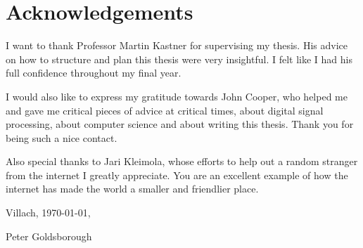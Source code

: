 \chapter*{Acknowledgements}

I want to thank Professor Martin Kastner for supervising my thesis. His advice on how to structure and plan this thesis were very insightful. I felt like I had his full confidence throughout my final year.

\noindent I would also like to express my gratitude towards John Cooper, who helped me and gave me critical pieces of advice at critical times, about digital signal processing, about computer science and about writing this thesis. Thank you for being such a nice contact.
\bigskip

\noindent Also special thanks to Jari Kleimola, whose efforts to help out a random stranger from the internet I greatly appreciate. You are an excellent example of how the internet has made the world a smaller and friendlier place.
\bigskip

\noindent Villach, \today,
\bigskip

\noindent Peter Goldsborough
